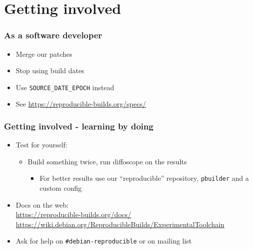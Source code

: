\documentclass[14pt]{beamer}
\begin{document}
\section{Getting involved}

\begin{frame}
 \frametitle{As a software developer}
 \begin{itemize}
  \item Merge our patches
  \item<2> Stop using build dates
  \item<2> Use \texttt{SOURCE\_DATE\_EPOCH} instead
  \item<2> See \url{https://reproducible-builds.org/specs/}
 \end{itemize}
\end{frame}

\begin{frame}
 \frametitle{Getting involved - learning by doing}

 \begin{itemize}
  \item Test for yourself:
   \begin{itemize}
    \item Build something twice, run diffoscope on the results
    \begin{itemize}
     \item For better results use our “reproducible” repository, \texttt{pbuilder} and a custom config
    \end{itemize}
   \end{itemize}
  \item Docs on the web: \\
    \small{\url{https://reproducible-builds.org/docs/}} \\
    \small{\url{https://wiki.debian.org/ReproducibleBuilds/ExperimentalToolchain}}
  \item Ask for help on \texttt{\#debian-reproducible} or on mailing list
 \end{itemize}
\end{frame}
\end{document}
